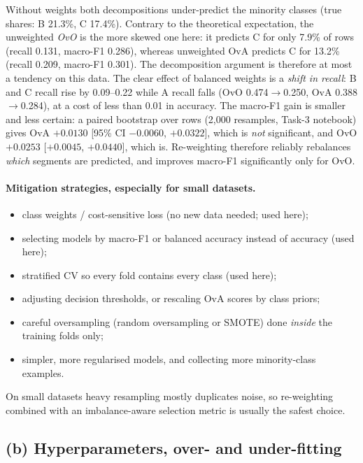 \documentclass[11pt]{article}
\begin{document}
Without weights both decompositions under-predict the minority classes (true shares: B 21.3\%,
C 17.4\%). Contrary to the theoretical expectation, the unweighted \emph{OvO} is the more skewed one
here: it predicts C for only 7.9\% of rows (recall 0.131, macro-F1 0.286), whereas unweighted OvA
predicts C for 13.2\% (recall 0.209, macro-F1 0.301). The decomposition argument is therefore at
most a tendency on this data. The clear effect of balanced weights is a \emph{shift in recall}: B and C
recall rise by 0.09--0.22 while A recall falls (OvO 0.474$\to$0.250, OvA 0.388$\to$0.284), at a cost of
less than 0.01 in accuracy. The macro-F1 gain is smaller and less certain: a paired bootstrap over rows
(2{,}000 resamples, Task-3 notebook) gives OvA $+0.0130$ [95\% CI $-0.0060$, $+0.0322$], which is
\emph{not} significant, and OvO $+0.0253$ [$+0.0045$, $+0.0440$], which is. Re-weighting therefore reliably
rebalances \emph{which} segments are predicted, and improves macro-F1 significantly only for OvO.

\paragraph{Mitigation strategies, especially for small datasets.}
\begin{itemize}
\item class weights / cost-sensitive loss (no new data needed; used here);
\item selecting models by macro-F1 or balanced accuracy instead of accuracy (used here);
\item stratified CV so every fold contains every class (used here);
\item adjusting decision thresholds, or rescaling OvA scores by class priors;
\item careful oversampling (random oversampling or SMOTE) done \emph{inside} the training folds only;
\item simpler, more regularised models, and collecting more minority-class examples.
\end{itemize}
On small datasets heavy resampling mostly duplicates noise, so re-weighting combined with an
imbalance-aware selection metric is usually the safest choice.

\subsection{(b) Hyperparameters, over- and under-fitting}
\end{document}
